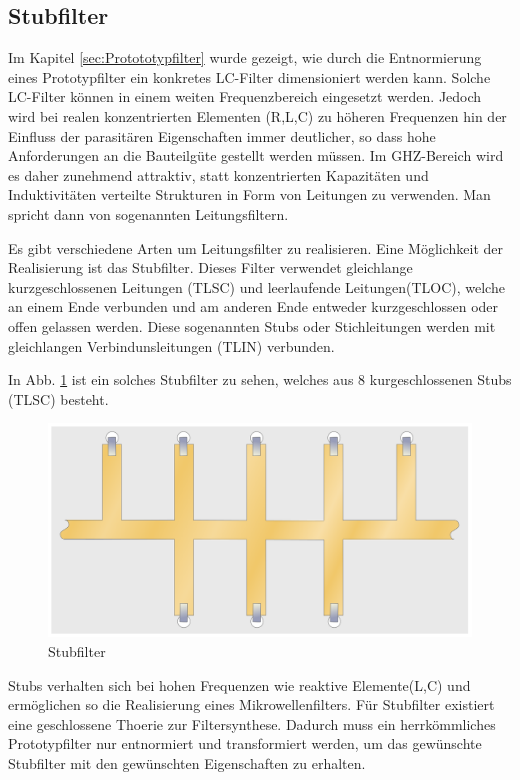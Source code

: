 \subsection{Stubfilter}

Im Kapitel \ref{sec:Protototypfilter} wurde gezeigt, wie durch die Entnormierung eines Prototypfilter ein konkretes LC-Filter dimensioniert werden kann. Solche LC-Filter  können in einem weiten Frequenzbereich  eingesetzt  werden.  Jedoch
wird  bei realen konzentrierten Elementen (R,L,C) zu höheren Frequenzen hin der Einfluss der parasitären Eigenschaften immer deutlicher, so dass hohe Anforderungen an die Bauteilgüte  gestellt  werden  müssen. Im GHZ-Bereich wird es daher  zunehmend attraktiv,  statt  konzentrierten  Kapazitäten  und  Induktivitäten  verteilte
Strukturen  in  Form  von  Leitungen  zu  verwenden.  Man  spricht   dann  von sogenannten Leitungsfiltern.

Es gibt verschiedene Arten um  Leitungsfilter zu realisieren. Eine Möglichkeit der  Realisierung  ist das Stubfilter.  Dieses  Filter  verwendet  gleichlange kurzgeschlossenen Leitungen (TLSC) und  leerlaufende  Leitungen(TLOC), welche an einem Ende verbunden und am anderen Ende entweder kurzgeschlossen
oder offen gelassen werden. Diese sogenannten Stubs oder Stichleitungen werden mit gleichlangen Verbindunsleitungen (TLIN) verbunden. 

In Abb. \ref{fig:Stubfilter} ist ein solches Stubfilter zu sehen, welches aus 8 kurgeschlossenen Stubs (TLSC) besteht.

\begin{figure}[h!]
\centering
 	\includegraphics[width=\imagewidth]{images/Stripline_Stub_Filter}
 	\caption{Stubfilter}
 	\label{fig:Stubfilter}
\end{figure}


Stubs verhalten sich bei  hohen  Frequenzen  wie  reaktive Elemente(L,C) und ermöglichen so die Realisierung  eines  Mikrowellenfilters. Für Stubfilter existiert eine geschlossene Thoerie zur Filtersynthese. Dadurch muss ein herrkömmliches Prototypfilter nur entnormiert und transformiert werden, um das gewünschte Stubfilter mit den gewünschten Eigenschaften zu erhalten.

